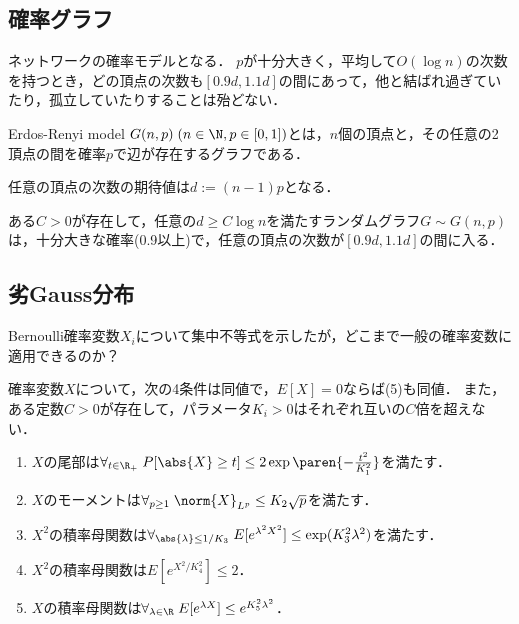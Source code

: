 \documentclass[uplatex,dvipdfmx]{jsreport}
\begin{document}
\subsection{確率グラフ}

\begin{tcolorbox}[colframe=ForestGreen, colback=ForestGreen!10!white,breakable,colbacktitle=ForestGreen!40!white,coltitle=black,fonttitle=\bfseries\sffamily,
title=]
    ネットワークの確率モデルとなる．
    $p$が十分大きく，平均して$O(\log n)$の次数を持つとき，どの頂点の次数も$[0.9d,1.1d]$の間にあって，他と結ばれ過ぎていたり，孤立していたりすることは殆どない．
\end{tcolorbox}

\begin{definition}
    Erdos-Renyi model $G(n,p)\;(n\in\N,p\in[0,1])$とは，$n$個の頂点と，その任意の2頂点の間を確率$p$で辺が存在するグラフである．
\end{definition}

\begin{lemma}
    任意の頂点の次数の期待値は$d:=(n-1)p$となる．
\end{lemma}

\begin{theorem}
    ある$C>0$が存在して，任意の$d\ge C\log n$を満たすランダムグラフ$G\sim G(n,p)$は，十分大きな確率(0.9以上)で，任意の頂点の次数が$[0.9d,1.1d]$の間に入る．
\end{theorem}

\subsection{劣Gauss分布}

\begin{tcolorbox}[colframe=ForestGreen, colback=ForestGreen!10!white,breakable,colbacktitle=ForestGreen!40!white,coltitle=black,fonttitle=\bfseries\sffamily,
title=]
    Bernoulli確率変数$X_i$について集中不等式を示したが，どこまで一般の確率変数に適用できるのか？
\end{tcolorbox}

\begin{proposition}
    確率変数$X$について，次の4条件は同値で，$E[X]=0$ならば(5)も同値．
    また，ある定数$C>0$が存在して，パラメータ$K_i>0$はそれぞれ互いの$C$倍を超えない．
    \begin{enumerate}
        \item $X$の尾部は$\forall_{t\in\R_+}\;P[\abs{X}\ge t]\le 2\exp\paren{-\frac{t^2}{K_1^2}}$を満たす．
        \item $X$のモーメントは$\forall_{p\ge 1}\;\norm{X}_{L^p}\le K_2\sqrt{p}$を満たす．
        \item $X^2$の積率母関数は$\forall_{\abs{\lambda}\le1/K_3}\;E[e^{\lambda^2X^2}]\le\exp(K_3^2\lambda^2)$を満たす．
        \item $X^2$の積率母関数は$E[e^{X^2/K_4^2}]\le 2$．
        \item $X$の積率母関数は$\forall_{\lambda\in\R}\;E[e^{\lambda X}]\le e^{K^2_5\lambda^2}$．
    \end{enumerate}
\end{proposition}
\end{document}
